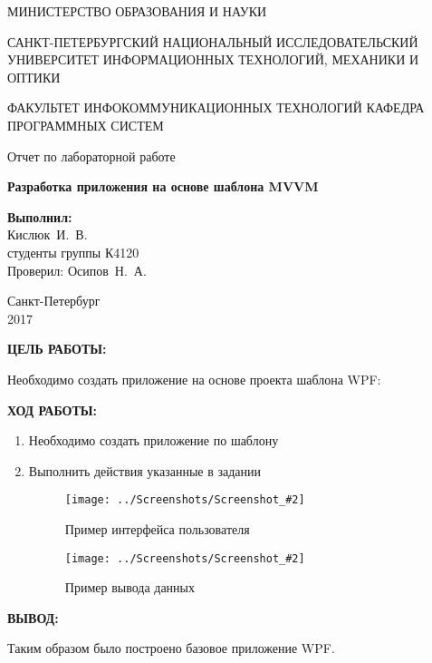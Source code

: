 \documentclass[14pt,a4paper]{extreport}
\newcommand{\screenshot}[2]{\begin{figure}[ht]%
\centering\texttt{[image: ../Screenshots/Screenshot\_\#2]}%
\caption{#1}%
\label{picture#2}%
\end{figure}%
}
\newcommand{\header}[1]{%
{
\fontsize{16pt}{14pt}\selectfont
\begin{center}
\textbf{\MakeUppercase{#1}:}
\end{center}
}
}
\newcommand{\osipov}{Осипов~Н.~А.}
\newcommand{\igork}{Кислюк~И.~В.}
\begin{document}
	\begin{titlepage}
	\begin{center}	
		\fontsize{14pt}{14pt}\selectfont
		МИНИСТЕРСТВО ОБРАЗОВАНИЯ И НАУКИ\\

		\vspace*{0.6\baselineskip}
		
		САНКТ-ПЕТЕРБУРГСКИЙ НАЦИОНАЛЬНЫЙ ИССЛЕДОВАТЕЛЬСКИЙ УНИВЕРСИТЕТ ИНФОРМАЦИОННЫХ ТЕХНОЛОГИЙ, МЕХАНИКИ И ОПТИКИ
		
		\vspace*{0.6\baselineskip}
		ФАКУЛЬТЕТ ИНФОКОММУНИКАЦИОННЫХ ТЕХНОЛОГИЙ
		КАФЕДРА ПРОГРАММНЫХ СИСТЕМ
	
		\vspace*{7\baselineskip}
		\fontsize{19pt}{18pt}\selectfont
		Отчет по лабораторной работе
		
		\fontsize{20pt}{18pt}\selectfont
		\textbf{Разработка приложения на основе шаблона
MVVM}\\
		\vspace*{1.15\baselineskip}
		\end{center}
	
	\vspace*{2\baselineskip}
	\begin{flushright}
	\fontsize{14pt}{14pt}\selectfont
	\textbf{Выполнил:}\\
	\igork\\
	студенты группы К4120\\
	Проверил: \osipov\\
	\end{flushright}
	
	\vspace{\fill}
	\begin{center}
	Санкт-Петербург\\
	2017
	\end{center}
	
\end{titlepage}

\newpage

\header{Цель работы}

\fontsize{14pt}{14pt}\selectfont

Необходимо создать приложение на основе проекта шаблона WPF:

\clearpage

\header{Ход работы}

\begin{enumerate}

\item Необходимо создать приложение по шаблону
\item Выполнить действия указанные в задании


\screenshot{Пример интерфейса пользователя}{4}
\screenshot{Пример вывода данных}{7}

\end{enumerate}

\clearpage

\header{Вывод}

Таким образом было построено базовое приложение WPF.
\end{document}
